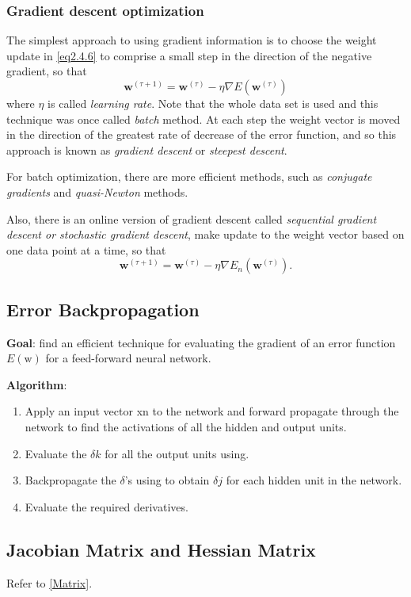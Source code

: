 \documentclass[a4paper]{book}
\newcommand{\mbf}{\mathbf}
\newcommand{\ww}{\mbf w}
\newcommand{\tit}{\textit}
\begin{document}
\subsubsection*{Gradient descent optimization}
The simplest approach to using gradient information is to choose the weight update in \ref{eq2.4.6} to comprise a small step in the direction of the negative gradient, so
that
\begin{equation}\label{}
  \ww^{(\tau+1)} =\ww^{(\tau)}-\eta\nabla E(\ww^{(\tau)})
\end{equation}
where $\eta$ is called \tit{learning rate}. Note that the whole data set is used and this technique was once called \tit{batch} method. At each step the weight vector is moved in the direction of the greatest rate of decrease of the error function, and so this approach is known as \tit{gradient descent} or \tit{steepest descent}.

For batch optimization, there are more efficient methods, such as \tit{conjugate gradients} and \tit{quasi-Newton} methods.

Also, there is an online version of gradient descent called \tit{sequential gradient descent or stochastic gradient descent}, make update to the weight vector based on one data point at a time, so that
\begin{equation}\label{}
  \ww^{(\tau+1)}=\ww^{(\tau)} -\eta\nabla E_n(\ww^{(\tau)}).
\end{equation}

\subsection{Error Backpropagation}
\textbf{Goal}: find an efficient technique for evaluating  the gradient of an error function $E(\mathrm w)$ for a feed-forward neural network.

\textbf{Algorithm}:
\begin{enumerate}
  \item Apply an input vector xn to the network and forward propagate through the network to find the activations of all the hidden and output units.
  \item Evaluate the $\delta k$ for all the output units using.
  \item Backpropagate the $\delta$’s using to obtain $\delta j$ for each hidden unit in the network.
  \item Evaluate the required derivatives.
\end{enumerate}
\subsection{Jacobian Matrix and Hessian Matrix}
Refer to \ref{Matrix}. 
\end{document}

